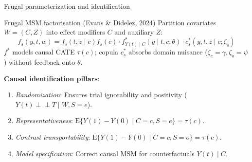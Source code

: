 \documentclass[t]{beamer}
\newcommand{\E}{\mathrm{E}}
\newcommand{\ci}{\perp\!\!\!\perp}
\begin{document}
\begin{frame}{Frugal parameterization and identification}


    \begin{block}{Frugal MSM factorisation (Evans \& Didelez, 2024)}
    Partition covariates $W = (C, Z)$ into effect modifiers $C$ and auxiliary $Z$:
    \begin{equation*}
        f_s(y, t, w) = f_s(t, z \mid c) f_s(c) \cdot f^*_{Y(t)\mid C}(y \mid t, c; \theta) \cdot c^*_s(y, t, z \mid c; \zeta_s)
    \end{equation*}
    $f^*$ models causal CATE $\tau(c)$; copula $c^*_s$ absorbs domain nuisance ($\zeta_e = \gamma, \zeta_o = \psi$) without feedback onto $\theta$.
    \end{block}

    \textbf{Causal identification pillars}:
    \begin{enumerate}
        \item \emph{Randomization}: Ensures trial ignorability and positivity ($Y(t) \ci T \mid W, S = e$).
        \item \emph{Representativeness}: $\E\{Y(1) - Y(0) \mid C=c, S=e\} = \tau(c)$.
        \item \emph{Contrast transportability}: $\E\{Y(1) - Y(0) \mid C=c, S=o\} = \tau(c)$.
        \item \emph{Model specification}: Correct causal MSM for counterfactuals $Y(t) \mid C$.
    \end{enumerate}
\end{frame}
\end{document}
